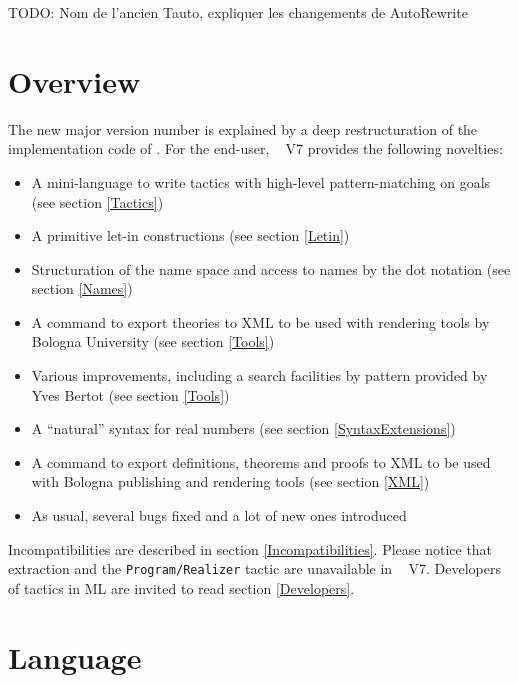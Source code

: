 \documentclass[11pt]{article}
\begin{document}


TODO: Nom de l'ancien Tauto, expliquer les changements de AutoRewrite

\section*{Overview}

The new major version number is explained by a deep restructuration of
the implementation code of \Coq. For the end-user, \Coq~
V7 provides the following novelties:

\begin{itemize}
\item A mini-language to write tactics with high-level
pattern-matching on goals  (see section \ref{Tactics})

\item A primitive let-in constructions (see section \ref{Letin})
\item Structuration of the name space and access to names by the dot notation (see section \ref{Names})
\item A command to export theories to XML to be used with rendering
tools by Bologna University (see section \ref{Tools})
\item Various improvements, including a search facilities by pattern
provided by Yves Bertot (see section \ref{Tools})
\item A ``natural'' syntax for real numbers (see section
\ref{SyntaxExtensions}) 
\item A command to export definitions, theorems and proofs to XML to
be used with Bologna publishing and rendering tools (see section \ref{XML})
\item As usual, several bugs fixed and a lot of new ones introduced
\end{itemize}

Incompatibilities are described in section
\ref{Incompatibilities}. Please notice that extraction and the
{\tt Program/Realizer} tactic are unavailable in \Coq~ V7.
Developers of tactics in ML are invited to read section
\ref{Developers}.

\section{Language}
\end{document}
